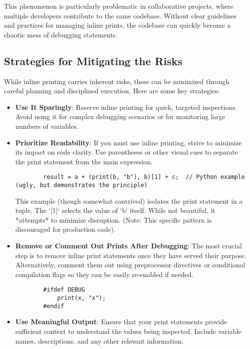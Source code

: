 \documentclass{article}
\begin{document}
{{{{This phenomenon is particularly problematic in collaborative projects, where multiple developers contribute to the same codebase. Without clear guidelines and practices for managing inline prints, the codebase can quickly become a chaotic mess of debugging statements.

\subsection*{Strategies for Mitigating the Risks}

While inline printing carries inherent risks, these can be minimized through careful planning and disciplined execution. Here are some key strategies:

\begin{itemize}
    \item \textbf{Use It Sparingly}: Reserve inline printing for quick, targeted inspections. Avoid using it for complex debugging scenarios or for monitoring large numbers of variables.
    \item \textbf{Prioritize Readability}: If you must use inline printing, strive to minimize its impact on code clarity. Use parentheses or other visual cues to separate the print statement from the main expression.

        \begin{verbatim}
        result = a + (print(b, "b"), b)[1] + c;  // Python example (ugly, but demonstrates the principle)
        \end{verbatim}
        This example (though somewhat contrived) isolates the print statement in a tuple.  The `[1]` selects the value of `b` itself.  While not beautiful, it *attempts* to minimize disruption. (Note: This specific pattern is discouraged for production code).

    \item \textbf{Remove or Comment Out Prints After Debugging}:  The most crucial step is to remove inline print statements once they have served their purpose.  Alternatively, comment them out using preprocessor directives or conditional compilation flags so they can be easily re-enabled if needed.

        \begin{verbatim}
        #ifdef DEBUG
            print(x, "x");
        #endif
        \end{verbatim}

    \item \textbf{Use Meaningful Output}: Ensure that your print statements provide sufficient context to understand the values being inspected. Include variable names, descriptions, and any other relevant information.


\end{itemize}}}}}
\end{document}
